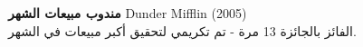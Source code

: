 \textbf{مندوب مبيعات الشهر} \hfill \foreignlanguage{english}{Dunder Mifflin (2005)}\\
الفائز بالجائزة 13 مرة - تم تكريمي لتحقيق أكبر مبيعات في الشهر.\\
\vspace*{2mm}